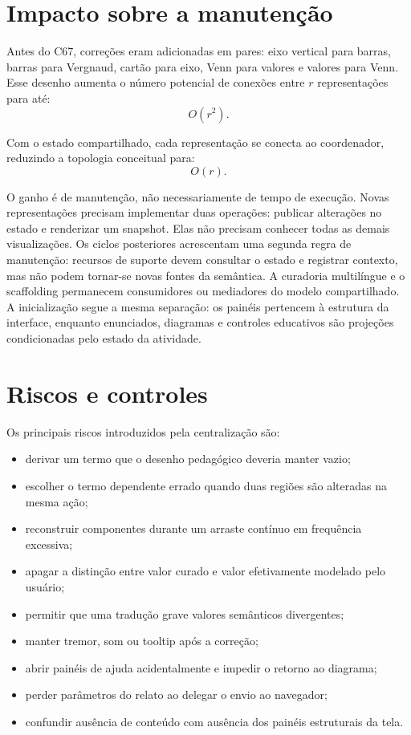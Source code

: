 \documentclass[12pt,a4paper]{article}
\begin{document}
\section{Impacto sobre a manutenção}

Antes do C67, correções eram adicionadas em pares: eixo vertical para barras, barras para Vergnaud, cartão para eixo, Venn para valores e valores para Venn. Esse desenho aumenta o número potencial de conexões entre $r$ representações para até:
\[
O(r^2).
\]

Com o estado compartilhado, cada representação se conecta ao coordenador, reduzindo a topologia conceitual para:
\[
O(r).
\]

O ganho é de manutenção, não necessariamente de tempo de execução. Novas representações precisam implementar duas operações: publicar alterações no estado e renderizar um snapshot. Elas não precisam conhecer todas as demais visualizações. Os ciclos posteriores acrescentam uma segunda regra de manutenção: recursos de suporte devem consultar o estado e registrar contexto, mas não podem tornar-se novas fontes da semântica. A curadoria multilíngue e o scaffolding permanecem consumidores ou mediadores do modelo compartilhado. A inicialização segue a mesma separação: os painéis pertencem à estrutura da interface, enquanto enunciados, diagramas e controles educativos são projeções condicionadas pelo estado da atividade.

\section{Riscos e controles}

Os principais riscos introduzidos pela centralização são:
\begin{itemize}[noitemsep]
  \item derivar um termo que o desenho pedagógico deveria manter vazio;
  \item escolher o termo dependente errado quando duas regiões são alteradas na mesma ação;
  \item reconstruir componentes durante um arraste contínuo em frequência excessiva;
  \item apagar a distinção entre valor curado e valor efetivamente modelado pelo usuário;
  \item permitir que uma tradução grave valores semânticos divergentes;
  \item manter tremor, som ou tooltip após a correção;
  \item abrir painéis de ajuda acidentalmente e impedir o retorno ao diagrama;
  \item perder parâmetros do relato ao delegar o envio ao navegador;
  \item confundir ausência de conteúdo com ausência dos painéis estruturais da tela.
\end{itemize}
\end{document}

